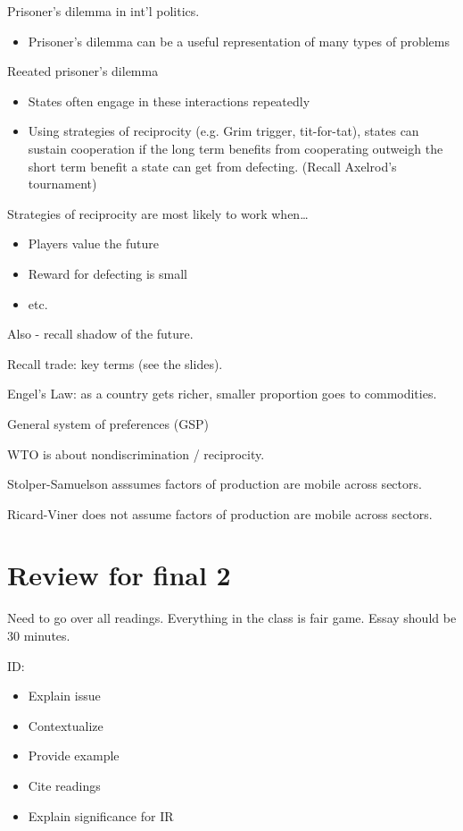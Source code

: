 \documentclass{article}
\begin{document}
Prisoner's dilemma in int'l politics.
\begin{itemize}
  \item Prisoner's dilemma can be a useful representation of many types of problems
\end{itemize}

Reeated prisoner's dilemma
\begin{itemize}
  \item States often engage in these interactions repeatedly
  \item Using strategies of reciprocity (e.g. Grim trigger, tit-for-tat), states can sustain cooperation if the long term benefits from cooperating outweigh the short term benefit a state can get from defecting.  (Recall Axelrod's tournament)
\end{itemize}

Strategies of reciprocity are most likely to work when\ldots
\begin{itemize}
  \item Players value the future
  \item Reward for defecting is small
  \item etc.
\end{itemize}

Also - recall shadow of the future.

Recall trade: key terms (see the slides).

Engel's Law: as a country gets richer, smaller proportion goes to commodities.

General system of preferences (GSP)

WTO is about nondiscrimination / reciprocity.

Stolper-Samuelson asssumes factors of production are mobile across sectors.

Ricard-Viner does not assume factors of production are mobile across sectors.

\section{Review for final 2}

Need to go over all readings.  Everything in the class is fair game.  Essay should be 30 minutes.

ID:
\begin{itemize}
  \item Explain issue
  \item Contextualize
  \item Provide example
  \item Cite readings
  \item Explain significance for IR
\end{itemize}
\end{document}

